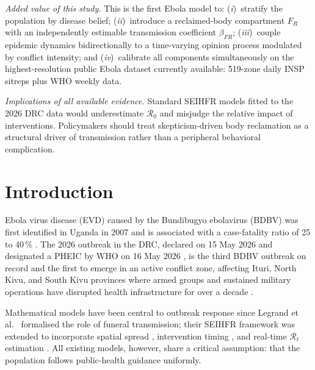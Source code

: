 \documentclass[12pt,a4paper]{article}
\begin{document}
\noindent\textit{Added value of this study.}
This is the first Ebola model to: (\emph{i})~stratify the population by
disease belief; (\emph{ii})~introduce a reclaimed-body compartment $F_R$
with an independently estimable transmission coefficient $\beta_{FR}$;
(\emph{iii})~couple epidemic dynamics bidirectionally to a time-varying
opinion process modulated by conflict intensity; and
(\emph{iv})~calibrate all components simultaneously on the highest-resolution
public Ebola dataset currently available: 519-zone daily INSP sitreps plus
WHO weekly data.

\noindent\textit{Implications of all available evidence.}
Standard SEIHFR models fitted to the 2026 DRC data would underestimate
$\mathcal{R}_0$ and misjudge the relative impact of interventions.
Policymakers should treat skepticism-driven body reclamation as a structural
driver of transmission rather than a peripheral behavioral complication.

\vspace{1em}

\section{Introduction}

Ebola virus disease (EVD) caused by the Bundibugyo ebolavirus (BDBV) was
first identified in Uganda in 2007 and is associated with a case-fatality
ratio of 25 to 40\,\% \citep{Towner2008}. The 2026 outbreak in the DRC, declared on 15 May 2026 \citep{WHODON602}
and designated a PHEIC by WHO on 16 May 2026 \citep{WHODON603}, is
the third BDBV outbreak on record and the first to emerge in an active
conflict zone, affecting Ituri, North Kivu, and South Kivu provinces where
armed groups and sustained military operations have disrupted health
infrastructure for over a decade \citep{Gayer2007}.

Mathematical models have been central to outbreak response since Legrand
et al.\ \citep{Legrand2007} formalised the role of funeral transmission;
their SEIHFR framework was extended to incorporate spatial spread
\citep{Gomes2014}, intervention timing \citep{Rivers2014}, and real-time
$\mathcal{R}_t$ estimation \citep{Althaus2014}. All existing models,
however, share a critical assumption: that the population follows
public-health guidance uniformly.
\end{document}
